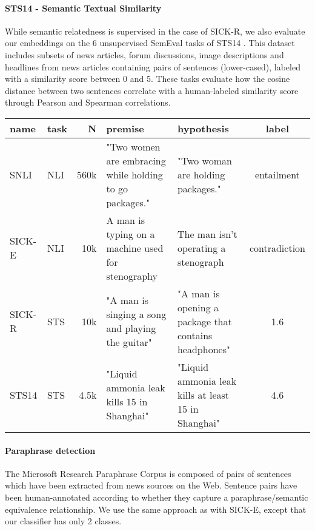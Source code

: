 \documentclass[11pt,letterpaper]{article}
\begin{document}
\paragraph{STS14 - Semantic Textual Similarity}
While semantic relatedness is supervised in the case of SICK-R, we also evaluate our embeddings on the 6 unsupervised SemEval tasks of STS14 \cite{agirre-EtAl:2014:SemEval}. This dataset includes subsets of news articles, forum discussions, image descriptions and headlines from news articles containing pairs of sentences (lower-cased), labeled with a similarity score between 0 and 5. These tasks evaluate how the cosine distance between two sentences correlate with a human-labeled similarity score through Pearson and Spearman correlations.
\begin{table*}[h!]
{\small
\centering
\begin{tabular}{|l|l|r|p{4.6cm}|p{4.6cm}|c|}
\hline \bf name & \bf task & \bf N & \bf premise & \bf hypothesis & \bf label \\
\hline
SNLI & NLI & 560k & "Two women are embracing while holding to go packages." & "Two woman are holding packages." & entailment\\ 
SICK-E & NLI & 10k & A man is typing on a machine used for stenography & The man isn't operating a stenograph & contradiction\\
SICK-R & STS & 10k & "A man is singing a song and playing the guitar" & "A man is opening a package that contains headphones" & 1.6\\
STS14 & STS & 4.5k & "Liquid ammonia leak kills 15 in Shanghai" & "Liquid ammonia leak kills at least 15 in Shanghai" & 4.6\\
\hline
\end{tabular}
\caption{\label{table:sts} {\bf Natural Language Inference and Semantic Textual Similarity tasks}. NLI labels are contradiction, neutral and entailment. STS labels are scores between 0 and 5.}
}\end{table*}

\paragraph{Paraphrase detection}
The Microsoft Research Paraphrase Corpus is composed of pairs of sentences which have been extracted from news sources on the Web. Sentence pairs have been human-annotated according to whether they capture a paraphrase/semantic equivalence relationship. We use the same approach as with SICK-E, except that our classifier has only 2 classes.
\end{document}
